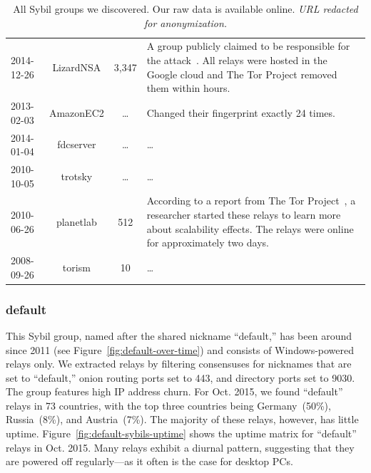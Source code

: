 \begin{table}[t]
\begin{tabular}{l c c p{10cm}}
2014-12-26 & LizardNSA & 3,347 & A group publicly claimed to be responsible for
the attack~\cite{lizards}.  All relays were hosted in the Google cloud and The
Tor Project removed them within hours. \\

2013-02-03 & AmazonEC2 & \ldots & Changed their fingerprint exactly 24 times. \\

2014-01-04 & fdcserver & \ldots & \ldots \\

2010-10-05 & trotsky & \ldots & \ldots \\

2010-06-26 & planetlab & 512 & According to a report from The Tor
Project~\cite{progressreport}, a researcher started these relays to learn more
about scalability effects.  The relays were online for approximately two days. \\

2008-09-26 & torism & 10 & \ldots \\
\end{tabular}
\caption{All Sybil groups we discovered.  Our raw data is available
online. \emph{URL redacted for anonymization.}}
\label{tab:sybils}
\end{table}

\subsubsection{default}
\label{sec:default-sybils}
This Sybil group, named after the shared nickname ``default,'' has been around
since 2011 (see Figure~\ref{fig:default-over-time}) and consists of
Windows-powered relays only.  We extracted relays by filtering consensuses
for nicknames that are set to ``default,'' onion routing ports set to 443, and
directory ports set to 9030.  The group features high IP address churn.  For
Oct. 2015, we found ``default'' relays in 73 countries, with the top three
countries being Germany~(50\%), Russia~(8\%), and Austria~(7\%).  The majority
of these relays, however, has little uptime.
Figure~\ref{fig:default-sybils-uptime} shows the uptime matrix for ``default''
relays in Oct. 2015.  Many relays exhibit a diurnal pattern, suggesting
that they are powered off regularly---as it often is the case for desktop PCs.

